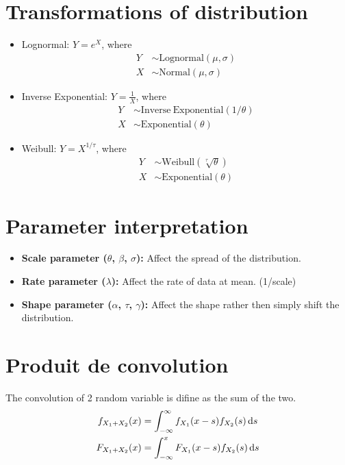 \documentclass[10pt, french]{article}
\begin{document}
\begin{multicols*}{3}
\section*{Transformations of distribution}
\label{Appendix: Transformations distribution}
\begin{itemize}[align=left,leftmargin=*]
    \item Lognormal: $Y = e^{X}$, where
    \begin{align*}
        Y &\sim \mathrm{Lognormal}(\mu, \sigma) \\
        X &\sim \mathrm{Normal}(\mu, \sigma)
    \end{align*}
    \item Inverse Exponential: $Y = \frac{1}{X}$, where
    \begin{align*}
        Y &\sim \mathrm{Inverse\:Exponential}(1/\theta) \\
        X &\sim \mathrm{Exponential}(\theta)
    \end{align*}
    \item Weibull: $Y = X^{1/\tau}$, where
    \begin{align*}
        Y &\sim \mathrm{Weibull}(\sqrt[\tau]{\theta}) \\
        X &\sim \mathrm{Exponential}(\theta)
    \end{align*}
\end{itemize}

\section*{Parameter interpretation}
\begin{itemize}[align=left,leftmargin=*]
    \item \textbf{Scale parameter ($\theta$, $\beta$, $\sigma$):} Affect the spread of the distribution.
    \item \textbf{Rate parameter ($\lambda$):} Affect the rate of data at mean. (1/scale)
    \item \textbf{Shape parameter ($\alpha$, $\tau$, $\gamma$):} Affect the shape rather then simply shift the distribution.
\end{itemize}

\section*{Produit de convolution}
The convolution of 2 random variable is difine as the sum of the two. \\
\begin{align*}
  f_{X_1+X_2}(x) &= \int_{-\infty}^\infty f_{X_1}(x - s)f_{X_2}(s)\mathop{}\!\mathrm{d}{s} \\
  F_{X_1+X_2}(x) &= \int_{-\infty}^x F_{X_1}(x - s)f_{X_2}(s)\mathop{}\!\mathrm{d}{s}
\end{align*}


\end{multicols*}
\end{document}

